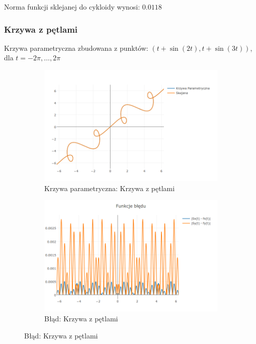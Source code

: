 \documentclass{article}
\begin{document}
Norma funkcji sklejanej do cykloidy wynosi: $0.0118$


	\subsubsection{Krzywa z pętlami}
	Krzywa parametryczna zbudowana z punktów: $(
	t+\sin(2t), t+\sin(3t) )$, dla $t= -2\pi,\dots,2\pi$
	\begin{figure}[h]
		\centering
		\begin{subfigure}{.44\textwidth}
			\includegraphics[width=\textwidth]{newplot(8).png}
			\caption{Krzywa parametryczna: Krzywa z pętlami}
			\label{Wykres:Krzywa z petlami}
		\end{subfigure}
		\begin{subfigure}{.44\textwidth}
			\includegraphics[width=\textwidth]{newplot(9).png}
			\caption{Błąd: Krzywa z pętlami}
			\label{Blad:Krzywa z petlami}
		\end{subfigure}
	\end{figure}
	
\end{document}
